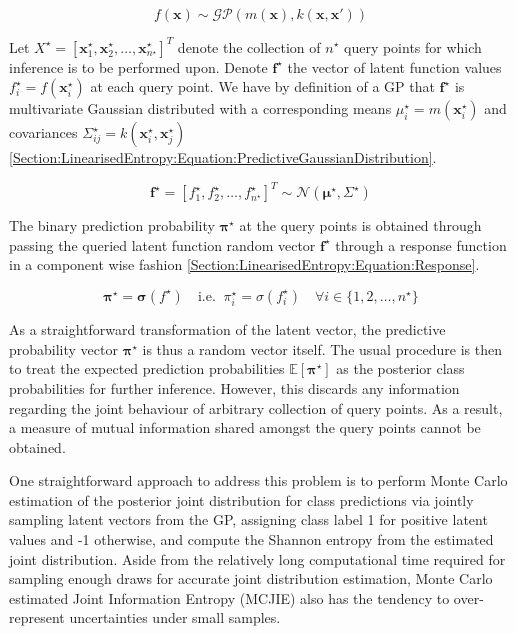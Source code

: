 \documentclass{article}
\renewcommand{\vec}[1]{\boldsymbol{#1}}
\begin{document}
		\begin{equation}
			f(\vec{x}) \sim \mathcal{GP}(m(\vec{x}), k(\vec{x}, \vec{x}'))
		\label{Section:LinearisedEntropy:Equation:PredictiveGP}
		\end{equation}
		
		Let $X^{\star} = [ \vec{x}^{\star}_{1}, \vec{x}^{\star}_{2}, \dots, \vec{x}^{\star}_{n^{\star}}]^{T}$ denote the collection of $n^{\star}$ query points for which inference is to be performed upon. Denote $\vec{f}^{\star}$ the vector of latent function values $f^{\star}_{i} = f(\vec{x}^{\star}_{i})$ at each query point. We have by definition of a GP that $\vec{f}^{\star}$ is multivariate Gaussian distributed with a corresponding means $\mu^{\star}_{i} = m(\vec{x}^{\star}_{i})$ and covariances $\Sigma^{\star}_{ij} = k(\vec{x}^{\star}_{i}, \vec{x}^{\star}_{j})$ \eqref{Section:LinearisedEntropy:Equation:PredictiveGaussianDistribution}.
		
		\begin{equation}
			\vec{f}^{\star} = [f^{\star}_{1}, f^{\star}_{2}, \dots, f^{\star}_{n^{\star}}]^{T} \sim \mathcal{N}(\vec{\mu}^{\star}, \Sigma^{\star})
		\label{Section:LinearisedEntropy:Equation:PredictiveGaussianDistribution}
		\end{equation}
			
		The binary prediction probability $\vec{\pi^{\star}}$ at the query points is obtained through passing the queried latent function random vector $\vec{f}^{\star}$ through a response function in a component wise fashion \eqref{Section:LinearisedEntropy:Equation:Response}.
		
		\begin{equation}
			\vec{\pi}^{\star} = \vec{\sigma}(f^{\star})\mathrm{ \quad i.e. \;\;}\pi^{\star}_{i} = \sigma(f^{\star}_{i}) \quad \forall i \in \{1, 2, \dots, n^{\star}\}
		\label{Section:LinearisedEntropy:Equation:Response}
		\end{equation}
		
		As a straightforward transformation of the latent vector, the predictive probability vector $\vec{\pi^{\star}}$ is thus a random vector itself. The usual procedure is then to treat the expected prediction probabilities $\mathbb{E}[\vec{\pi^{\star}}]$ as the posterior class probabilities for further inference. However, this discards any information regarding the joint behaviour of arbitrary collection of query points. As a result, a measure of mutual information shared amongst the query points cannot be obtained.
		
		One straightforward approach to address this problem is to perform Monte Carlo estimation of the posterior joint distribution for class predictions via jointly sampling latent vectors from the GP, assigning class label 1 for positive latent values and -1 otherwise, and compute the Shannon entropy \cite{ShannonEntropy} from the estimated joint distribution. Aside from the relatively long computational time required for sampling enough draws for accurate joint distribution estimation, Monte Carlo estimated Joint Information Entropy (MCJIE) also has the tendency to over-represent uncertainties under small samples.
				
\end{document}
